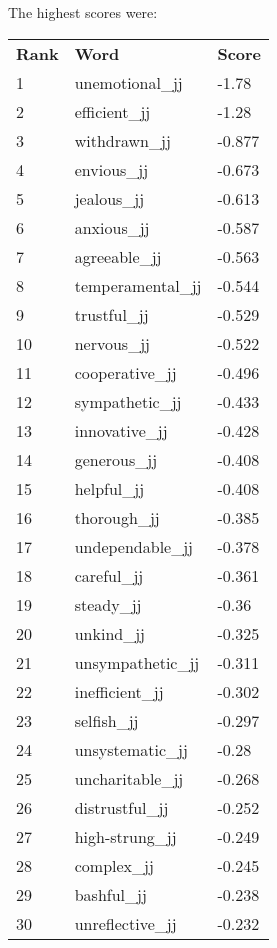 \documentclass[10pt,letterpaper]{book}
\begin{document}
The highest scores were:
\begin{tabular}{ l l l }
        \textbf{Rank} & \textbf{Word} & \textbf{Score} \\
        1 & unemotional\_jj & -1.78 \\
        2 & efficient\_jj & -1.28 \\
        3 & withdrawn\_jj & -0.877 \\
        4 & envious\_jj & -0.673 \\
        5 & jealous\_jj & -0.613 \\
        6 & anxious\_jj & -0.587 \\
        7 & agreeable\_jj & -0.563 \\
        8 & temperamental\_jj & -0.544 \\
        9 & trustful\_jj & -0.529 \\
        10 & nervous\_jj & -0.522 \\
        11 & cooperative\_jj & -0.496 \\
        12 & sympathetic\_jj & -0.433 \\
        13 & innovative\_jj & -0.428 \\
        14 & generous\_jj & -0.408 \\
        15 & helpful\_jj & -0.408 \\
        16 & thorough\_jj & -0.385 \\
        17 & undependable\_jj & -0.378 \\
        18 & careful\_jj & -0.361 \\
        19 & steady\_jj & -0.36 \\
        20 & unkind\_jj & -0.325 \\
        21 & unsympathetic\_jj & -0.311 \\
        22 & inefficient\_jj & -0.302 \\
        23 & selfish\_jj & -0.297 \\
        24 & unsystematic\_jj & -0.28 \\
        25 & uncharitable\_jj & -0.268 \\
        26 & distrustful\_jj & -0.252 \\
        27 & high-strung\_jj & -0.249 \\
        28 & complex\_jj & -0.245 \\
        29 & bashful\_jj & -0.238 \\
        30 & unreflective\_jj & -0.232 \\
\end{tabular}
\end{document}
